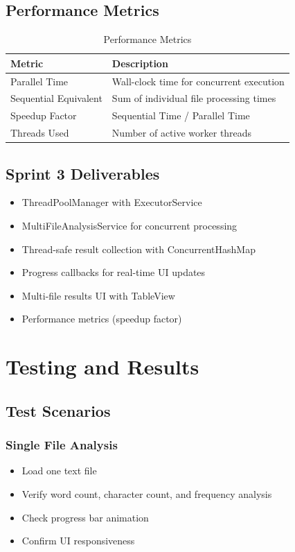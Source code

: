 \documentclass[12pt,a4paper]{report}
\begin{document}
\section{Performance Metrics}
\begin{table}[H]
\centering
\begin{tabularx}{\textwidth}{|l|X|}
\hline
\textbf{Metric} & \textbf{Description} \\
\hline
Parallel Time & Wall-clock time for concurrent execution \\
\hline
Sequential Equivalent & Sum of individual file processing times \\
\hline
Speedup Factor & Sequential Time / Parallel Time \\
\hline
Threads Used & Number of active worker threads \\
\hline
\end{tabularx}
\caption{Performance Metrics}
\end{table}

\section{Sprint 3 Deliverables}
\begin{itemize}
    \item[$\checkmark$] ThreadPoolManager with ExecutorService
    \item[$\checkmark$] MultiFileAnalysisService for concurrent processing
    \item[$\checkmark$] Thread-safe result collection with ConcurrentHashMap
    \item[$\checkmark$] Progress callbacks for real-time UI updates
    \item[$\checkmark$] Multi-file results UI with TableView
    \item[$\checkmark$] Performance metrics (speedup factor)
\end{itemize}

\chapter{Testing and Results}

\section{Test Scenarios}

\subsection{Single File Analysis}
\begin{itemize}
    \item Load one text file
    \item Verify word count, character count, and frequency analysis
    \item Check progress bar animation
    \item Confirm UI responsiveness
\end{itemize}
\end{document}
